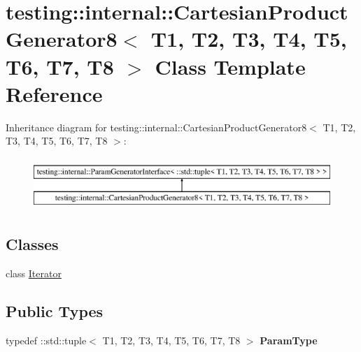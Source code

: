 \hypertarget{classtesting_1_1internal_1_1_cartesian_product_generator8}{}\section{testing\+:\+:internal\+:\+:Cartesian\+Product\+Generator8$<$ T1, T2, T3, T4, T5, T6, T7, T8 $>$ Class Template Reference}
\label{classtesting_1_1internal_1_1_cartesian_product_generator8}
Inheritance diagram for testing\+:\+:internal\+:\+:Cartesian\+Product\+Generator8$<$ T1, T2, T3, T4, T5, T6, T7, T8 $>$\+:\begin{figure}[H]
\begin{center}
\leavevmode
\includegraphics[height=2.000000cm]{classtesting_1_1internal_1_1_cartesian_product_generator8}
\end{center}
\end{figure}
\subsection*{Classes}
\begin{DoxyCompactItemize}
\item 
class \mbox{\hyperlink{classtesting_1_1internal_1_1_cartesian_product_generator8_1_1_iterator}{Iterator}}
\end{DoxyCompactItemize}
\subsection*{Public Types}
\begin{DoxyCompactItemize}
\item 
\mbox{\label{classtesting_1_1internal_1_1_cartesian_product_generator8_a75fc8856e032710e9efe753ad788dcf1}} 
typedef \+::std\+::tuple$<$ T1, T2, T3, T4, T5, T6, T7, T8 $>$ {\bfseries Param\+Type}
\end{DoxyCompactItemize}
